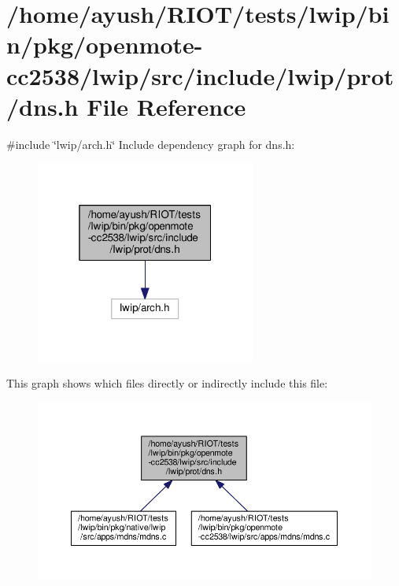 \hypertarget{openmote-cc2538_2lwip_2src_2include_2lwip_2prot_2dns_8h}{}\section{/home/ayush/\+R\+I\+O\+T/tests/lwip/bin/pkg/openmote-\/cc2538/lwip/src/include/lwip/prot/dns.h File Reference}
\label{openmote-cc2538_2lwip_2src_2include_2lwip_2prot_2dns_8h}
{\ttfamily \#include \char`\"{}lwip/arch.\+h\char`\"{}}\newline
Include dependency graph for dns.\+h\+:
\nopagebreak
\begin{figure}[H]
\begin{center}
\leavevmode
\includegraphics[width=205pt]{openmote-cc2538_2lwip_2src_2include_2lwip_2prot_2dns_8h__incl}
\end{center}
\end{figure}
This graph shows which files directly or indirectly include this file\+:
\nopagebreak
\begin{figure}[H]
\begin{center}
\leavevmode
\includegraphics[width=350pt]{openmote-cc2538_2lwip_2src_2include_2lwip_2prot_2dns_8h__dep__incl}
\end{center}
\end{figure}
